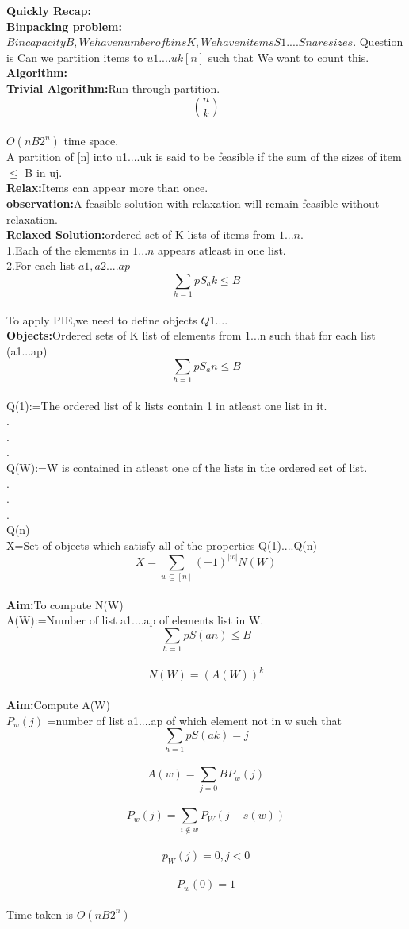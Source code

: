 \textbf{Quickly Recap:}\\
\textbf{Binpacking problem:}\\
$Bin capacity B,We have number of bins K,We have n items S1....Sn are sizes.$ 
Question is Can we partition items to $u1....uk[n]$ such that
  We want to count this.\\
  \textbf{Algorithm:}\\
  \textbf{Trivial Algorithm:}Run through partition.\\
$$ n \choose k$$\\
$O(nB2^{n})$ time space.\\
A partition of [n] into u1....uk is said to be feasible if the sum of the sizes of item $\leq$ B in uj.\\
\textbf{Relax:}Items can appear more than once.\\
\textbf{observation:}A feasible solution with relaxation will remain feasible without relaxation.\\
\textbf{Relaxed Solution:}ordered set of K lists of items from ${1...n}$.\\
1.Each of the elements in ${1...n}$ appears atleast in one list.\\
2.For each list $a1,a2....ap$
$$\sum_{h=1}{p}S_ak \leq B $$\\
To apply PIE,we need to define objects $Q1....$\\
\textbf{Objects:}Ordered sets of K list of elements from {1...n} such that for each list (a1...ap) $$\sum_{h=1}{p}S_an \leq B $$\\
Q(1):=The ordered list of k lists contain 1 in atleast one list in it.\\
.\\
.\\
.\\
Q(W):=W  is contained in atleast one of the lists in the ordered set of list.\\
.\\
.\\
.\\
Q(n)\\
X=Set of objects which satisfy all of the properties Q(1)....Q(n)\\
$$X=\sum_{w \subseteq [n]}(-1)^{|w|} N(W) $$\\
\textbf{Aim:}To compute N(W)\\
A(W):=Number of list a1....ap of elements list in W.\\
$$ \sum_{h=1}{p}S(an) \leq B $$\\
$$N(W)=(A(W))^{k}  $$\\
\textbf{Aim:}Compute A(W)\\
$P_w(j)$ =number of list a1....ap of which element not in w such that
$$\sum_{h=1}{p}S(ak)=j  $$\\
$$A(w)=\sum_{j=0}{B}P_w(j)$$\\
$$P_w(j)=\sum_{i \notin w}P_W(j-s(w)) $$\\
$$ p_W(j)=0, j<0 $$\\
$$P_w(0)=1 $$\\
Time taken is $O(nB2^{n})$


